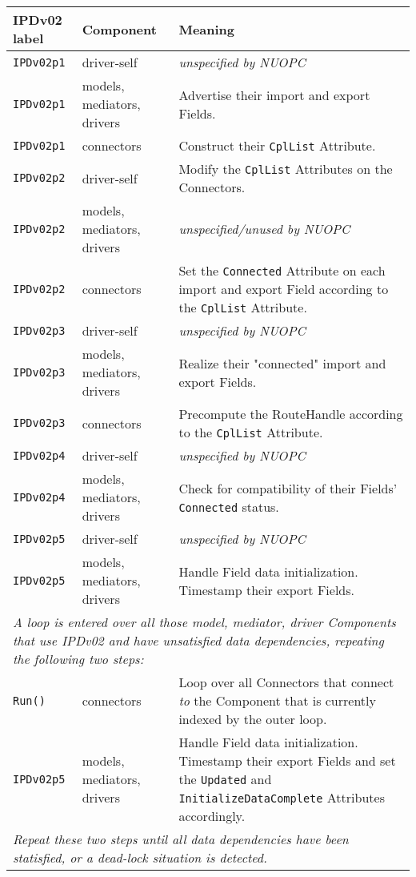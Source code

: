 \vspace*{3ex}
\begin{longtable}[h]{|p{35mm}|p{4cm}|p{6cm}|}
     \hline\hline
     {\bf IPDv02 label} & {\bf Component} & {\bf Meaning}\\
     \hline\hline
     {\tt IPDv02p1} & driver-self                 & {\em unspecified by NUOPC}\\ \hline
     {\tt IPDv02p1} & models, mediators, drivers  & Advertise their import and export Fields.\\ \hline
     {\tt IPDv02p1} & connectors                  & Construct their {\tt CplList} Attribute.\\ \hline
     {\tt IPDv02p2} & driver-self                 & Modify the {\tt CplList} Attributes on the Connectors.\\ \hline
     {\tt IPDv02p2} & models, mediators, drivers  & {\em unspecified/unused by NUOPC}\\ \hline
     {\tt IPDv02p2} & connectors                  & Set the {\tt Connected} Attribute on each import and export Field according to the {\tt CplList} Attribute.\\ \hline
     {\tt IPDv02p3} & driver-self                 & {\em unspecified by NUOPC}\\ \hline
     {\tt IPDv02p3} & models, mediators, drivers  & Realize their "connected" import and export Fields.\\ \hline
     {\tt IPDv02p3} & connectors                  & Precompute the RouteHandle according to the {\tt CplList} Attribute.\\ \hline
     {\tt IPDv02p4} & driver-self                 & {\em unspecified by NUOPC}\\ \hline
     {\tt IPDv02p4} & models, mediators, drivers  & Check for compatibility of their Fields' {\tt Connected} status.\\ \hline
     {\tt IPDv02p5} & driver-self                 & {\em unspecified by NUOPC}\\ \hline
     {\tt IPDv02p5} & models, mediators, drivers  & Handle Field data initialization. Timestamp their export Fields.\\ \hline
     \multicolumn{3}{|p{13.5cm}|}{\it A loop is entered over all those model, mediator, driver Components that use IPDv02 and have
     unsatisfied data dependencies, repeating the following two steps:}\\ \hline
     {\tt Run()}    & connectors                  & Loop over all Connectors that connect {\it to} the Component that is currently indexed by the outer loop.\\ \hline
     {\tt IPDv02p5} & models, mediators, drivers  & Handle Field data initialization. Timestamp their export Fields and set the {\tt Updated} and {\tt InitializeDataComplete} Attributes accordingly.\\ \hline
     \multicolumn{3}{|p{13.5cm}|}{\it Repeat these two steps until all data
     dependencies have been statisfied, or a dead-lock situation is detected.}\\ 
     \hline\hline
\end{longtable}


